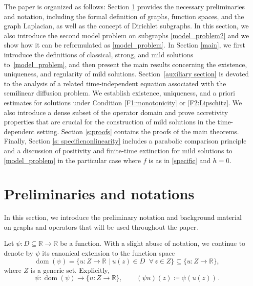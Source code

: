 \documentclass[journal]{article}
\theoremstyle{nonitalic}
\theoremstyle{nonitalic}
\theoremstyle{plain} %
\numberwithin{equation}{section}
\newcommand{\R}{\mathbb{R}}
\newcommand{\dom}{\operatorname{dom}}
\begin{document}
The paper is organized as follows: Section \ref{sec:notation} provides the necessary preliminaries and notation, including the formal definition of graphs, function spaces, and the graph Laplacian, as well as the concept of Dirichlet subgraphs. In this section, we also introduce the second model problem on subgraphs \ref{model_problem2} and we show how it can be reformulated as \ref{model_problem}. In Section \ref{main}, we first introduce the definitions of classical, strong, and mild solutions to~\ref{model_problem}, and then present the main results concerning the existence, uniqueness, and regularity of mild solutions. Section~\ref{auxiliary section} is devoted to the analysis of a related time-independent equation associated with the semilinear diffusion problem. We establish existence, uniqueness, and a priori estimates for solutions under Condition \ref{F1:monotonicity} or \ref{F2:Lipschitz}. We also introduce a dense subset of the operator domain and prove accretivity properties that are crucial for the construction of mild solutions in the time-dependent setting. Section \ref{s:proofs} contains the proofs of the main theorems. Finally, Section \ref{s: specificnonlinearity} includes a parabolic comparison principle and a discussion of positivity and finite-time extinction for mild solutions to \ref{model_problem} in the particular case where $f$ is as in \eqref{specific} and $h=0$.
 

\section{Preliminaries and notations}\label{sec:notation}
In this section, we introduce the preliminary notation and background material on graphs and operators that will be used throughout the paper.  

Let $\psi \colon D \subseteq \R \to \R$ be a function. With a slight abuse of notation, we continue to denote by $\psi$ its canonical extension to the function space
\[
\dom(\psi) =\{ u \colon Z \to \R \mid u(z) \in D \;\; \forall\, z\in Z\}\subseteq \{u \colon Z \to \R \},
\]
where $Z$ is a generic set. Explicitly,
\[
\psi \colon \dom(\psi) \to \{u \colon Z \to \R \}, \qquad (\psi u)(z) \coloneqq \psi(u(z)).
\]
\end{document}
